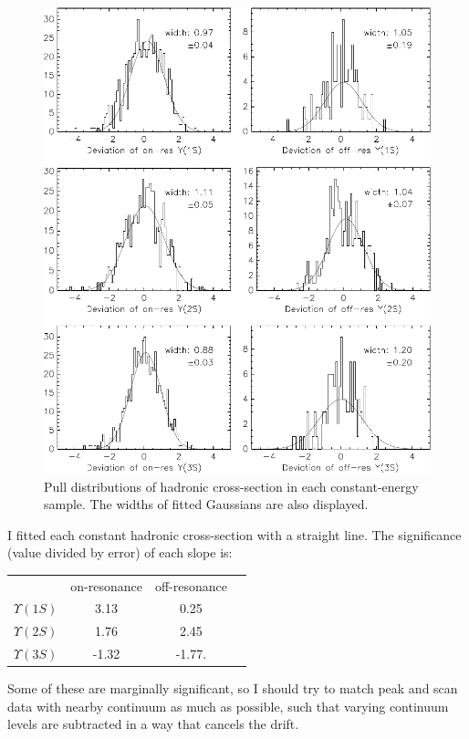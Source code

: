 \begin{figure}[p]
  \includegraphics[width=\linewidth]{plots/runbyrun_peaksconts2}
  \caption{\label{runbyrun_peaksconts2} Pull distributions of hadronic
  cross-section in each constant-energy sample.  The widths of fitted
  Gaussians are also displayed.}
\end{figure}

I fitted each constant hadronic cross-section with a straight line.
The significance (value divided by error) of each slope is:
\begin{center}
  \begin{tabular}{c c c c}
    & on-resonance & off-resonance \\
    $\Upsilon(1S)$ & 3.13 & 0.25 \\
    $\Upsilon(2S)$ & 1.76 & 2.45 \\
    $\Upsilon(3S)$ & -1.32 & -1.77. \\
  \end{tabular}
\end{center}
Some of these are marginally significant, so I should try to match
peak and scan data with nearby continuum as much as possible, such
that varying continuum levels are subtracted in a way that cancels the
drift.

